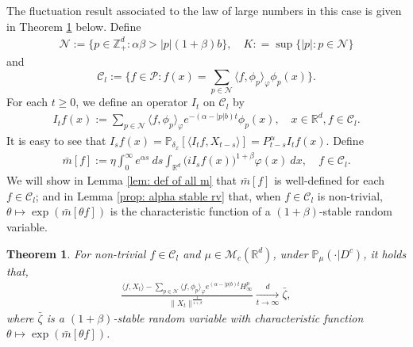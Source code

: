 \documentclass[12pt,a4paper]{amsart}
\theoremstyle{plain}
\newtheorem{thm}{Theorem}[section]
\theoremstyle{definition}
\numberwithin{equation}{section}
\begin{document}
The fluctuation result associated to the law of large numbers in this case is given in Theorem \ref{thm: large clt} below.
Define
\begin{align}
  \label{eq: def of N}
  \mathcal{N}
  :=\{p\in \mathbb{Z}_+^d: \alpha\beta>|p|(1+\beta)b\},
  \quad K : = \sup\{|p|: p \in \mathcal N\}
\end{align}
and
\begin{equation}
  \label{eq: def of Cl}
  \mathcal{C}_l
  :=\Big\{f\in \mathcal P: f(x)=\sum_{p\in\mathcal{N}}\langle f, \phi_p\rangle_{\varphi}\phi_p(x)\Big\}.
\end{equation}
For each $t\ge 0$, we define an operator $I_t$ on $\mathcal{C}_l$ by
\begin{align}
  \label{definition of Itf}
  I_t f(x)
  := \sum_{p\in \mathcal{N}}\langle f, \phi_p\rangle_{\varphi} e^{-(\alpha-|p|b)t}\phi_p(x)
  , \quad x\in \mathbb{R}^d, f\in \mathcal C_l.
\end{align}
It is easy to see that $I_sf(x)=\mathbb{P}_{\delta_x}[\langle I_t f, X_{t-s}\rangle]=P_{t-s}^{\alpha}I_tf(x)$.
Define
\begin{align}
  \label{bar-m}
  \bar{m}[f]
  :=\eta \int_{0}^{\infty} e^{\alpha s}~ds \int_{\mathbb R^d} \big(iI_sf(x)\big)^{1+\beta}\varphi(x)~dx,
  \quad f\in \mathcal C_l.
\end{align}
We will show in Lemma \ref{lem: def of all m} that $\bar{m}[f]$ is well-defined for each $f\in \mathcal C_l$; 
and in Lemma \ref{prop: alpha stable rv} that, when $f\in \mathcal C_l$ is non-trivial, $\theta \mapsto \exp( \bar m[\theta f])$ is the characteristic function of a $(1+\beta)$-stable random variable.
\begin{thm}
  \label{thm: large clt}
  For non-trivial $f\in\mathcal{C}_l$ and $\mu\in \mathcal{M}_c(\mathbb{R}^d)$, under $\mathbb{P}_{\mu}(\cdot|D^c)$, it holds that,
  \begin{align}
    \label{thm: large rate}
    \frac{\langle f, X_t\rangle-\sum_{p\in\mathcal{N}}\langle f,\phi_p\rangle_\varphi e^{(\alpha-|p|b)t}H^p_{\infty}}{\|X_t\|^\frac{1}{1+\beta}}
    \xrightarrow[t\to \infty]{d}\bar{\zeta},
  \end{align}
  where $\bar{\zeta}$ is a $(1+\beta)$-stable random variable with characteristic function $\theta\mapsto \exp(\bar{m}[\theta f])$.
\end{thm}

\end{document}
